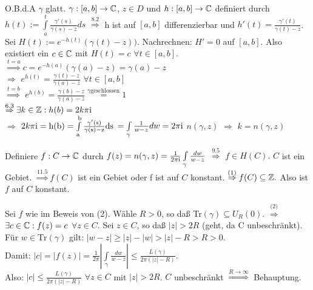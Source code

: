 \documentclass[a4paper,twoside,DIV15,BCOR12mm]{scrbook}
\def\ie{\rm i}
\begin{document}
\begin{beweis}
\begin{liste}
\item O.B.d.A $\gamma$ glatt. $ \gamma : [a,b] \to \mathbb{C}$, $z \in D$ und $h:[a,b]
\to \mathbb{C}$ definiert durch $h(t) := \int\limits_{a}^{t}
\frac{\gamma'(s)}{\gamma(s)-z} ds$  
$\stackrel{\text{8.2}}{\Rightarrow}$ h ist auf $[a,b]$ differenzierbar und $h'(t) =
\frac{\gamma'(t)}{\gamma(t)-z}$.  \\ Sei $H(t) := e^{-h(t)}(\gamma(t)-z)).$
Nachrechnen: $H' = 0$ auf $[a,b]$. Also existiert ein $c \in \mathbb{C}$ mit $H(t) = c$
$\forall t \in [a,b]$. \\ $\stackrel{t = a}{\Rightarrow}c = 
e^{-h(a)}(\gamma(a)-z) = \gamma(a) -z$ \\
$\Rightarrow $ $e^{h(t)} = \frac{\gamma(t)-z}{\gamma(a)-z}$ $\forall t \in
[a,b]$ \\
$\stackrel{t = b}{\Rightarrow}$ $e^{h(b)} = \frac{\gamma(b)-z}{\gamma(a)-z}
\stackrel{\gamma \text{geschlossen}}{=} 1$
\\ $\stackrel{\text{6.3}}{\Rightarrow} \exists k \in \MdZ: h(b) = 2k \pi \ie$ \\
$\Rightarrow$ $2k \pi \ie = h(b) = \int\limits_{a}^{b}
\frac{\gamma'(s)}{\gamma(s)-z} ds$ $= \int\limits_{\gamma}
\frac{1}{w-z} dw = 2 \pi \ie $ $n(\gamma,z)$ $\Rightarrow$ $ k = n(\gamma, z)$
\item Definiere $f: C \to \mathbb{C}$ durch $f(z) = n(\gamma, z) = \frac{1}{2 \pi \ie
} \int\limits_{\gamma}\frac{dw}{w-z}$ $\stackrel{9.5}{\Rightarrow}$ $f \in H(C).
$ $C$ ist ein Gebiet. $\stackrel{\text{11.5}}{\Rightarrow} f(C)$ ist ein Gebiet oder f
ist auf $C$ konstant. $\stackrel{\text{(1)}}{\Rightarrow} f(C) \subseteq \mathbb{Z}.$
Also ist $f$ auf $C$ konstant. 
\item Sei $f$ wie im Beweis von (2). Wähle $R > 0$, so daß Tr$(\gamma) \subseteq
U_R(0).$ $\stackrel{\text{(2)}}{\Rightarrow}$ $\exists c \in \mathbb{C}: f(z) = c$
$\forall z \in C$. Sei $z \in C$, so daß $|z| > 2R$ (geht, da C
unbeschränkt). \\
Für $w \in \text{Tr}(\gamma)$ gilt: $|w-z| \geq |z|-|w| > |z| -R > R > 0$. \\
Damit: $|c| = |f(z)| = \frac{1}{2 \pi} |\int\limits_{\gamma} \frac{dw}{w-z}|
\leq \frac{L(\gamma)}{2 \pi (|z| -R)}$. \\
Also: $|c| \leq \frac{L(\gamma)}{2 \pi (|z| -R)}$ $\forall z \in C$ mit $|z| >
2R$. $C$ unbeschränkt $\stackrel{R \to \infty}{\Rightarrow}$  Behauptung.
\end{liste}
\end{beweis}
\end{document}
